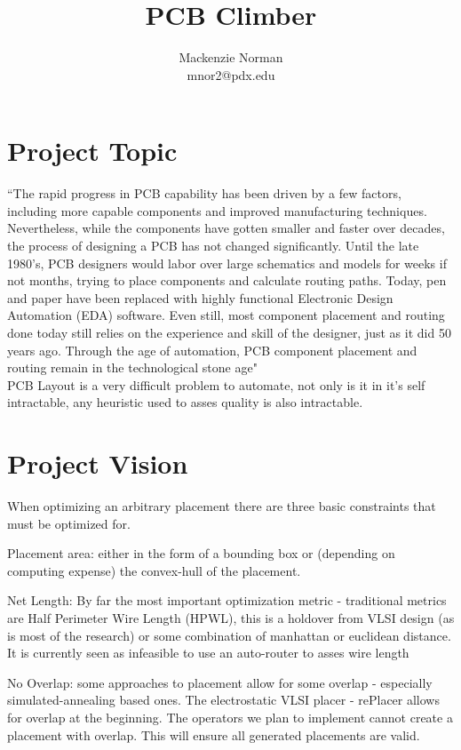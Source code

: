 \documentclass{article}
\title{PCB Climber}
\author{Mackenzie Norman\\ mnor2@pdx.edu}
\begin{document}
\maketitle
\section{Project Topic}

``The rapid progress in PCB capability has been driven by a few factors, including more capable components and improved manufacturing techniques. Nevertheless, while the components have gotten smaller and faster over decades, the process of designing a PCB has not changed significantly. Until the late 1980’s, PCB designers would labor over large schematics and models for weeks if not months, trying to place components and calculate routing paths. Today, pen and paper have been replaced with highly functional Electronic Design Automation (EDA) software. Even still, most component placement and routing done today still relies on the experience and skill of the designer, just as it did 50 years ago. Through the age of automation, PCB component placement and routing remain in the technological stone age" \\

PCB Layout is a very difficult problem to automate, not only is it in it's self intractable, any heuristic used to asses quality is also intractable.\\

\section{Project Vision}

When optimizing an arbitrary placement there are three basic constraints that must be optimized for.

Placement area: either in the form of a bounding box or (depending on computing expense) the convex-hull of the placement. 

Net Length: By far the most important optimization metric - traditional metrics are Half Perimeter Wire Length (HPWL), this is a holdover from VLSI design (as is most of the research) or some combination of manhattan or euclidean distance. It is currently seen as infeasible to use an auto-router to asses wire length

No Overlap: some approaches to placement allow for some overlap - especially simulated-annealing based ones. The electrostatic VLSI placer - rePlacer allows for overlap at the beginning. The operators we plan to implement cannot create a placement with overlap. This will ensure all generated placements are valid. 
\end{document}
